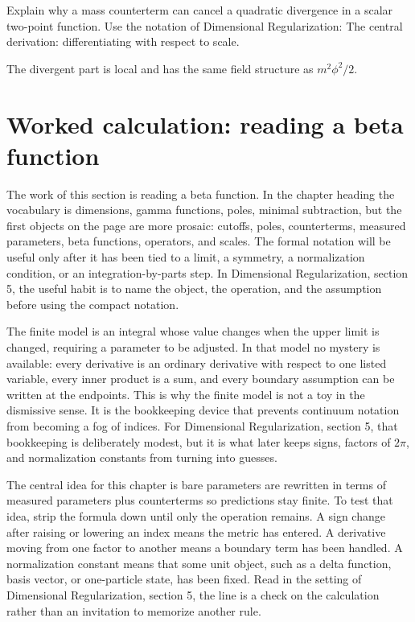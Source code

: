 \begin{exercise}
Explain why a mass counterterm can cancel a quadratic divergence in a scalar two-point function.  Use the notation of Dimensional Regularization: The central derivation: differentiating with respect to scale.
\begin{answer}
The divergent part is local and has the same field structure as \(m^2\phi^2/2\).
\end{answer}
\end{exercise}



\section{Worked calculation: reading a beta function}

The work of this section is reading a beta function.  In the chapter heading the vocabulary is dimensions, gamma functions, poles, minimal subtraction, but the first objects on the page are more prosaic: cutoffs, poles, counterterms, measured parameters, beta functions, operators, and scales.  The formal notation will be useful only after it has been tied to a limit, a symmetry, a normalization condition, or an integration-by-parts step.  In Dimensional Regularization, section 5, the useful habit is to name the object, the operation, and the assumption before using the compact notation.

The finite model is an integral whose value changes when the upper limit is changed, requiring a parameter to be adjusted.  In that model no mystery is available: every derivative is an ordinary derivative with respect to one listed variable, every inner product is a sum, and every boundary assumption can be written at the endpoints.  This is why the finite model is not a toy in the dismissive sense.  It is the bookkeeping device that prevents continuum notation from becoming a fog of indices.  For Dimensional Regularization, section 5, that bookkeeping is deliberately modest, but it is what later keeps signs, factors of \(2\pi\), and normalization constants from turning into guesses.

The central idea for this chapter is bare parameters are rewritten in terms of measured parameters plus counterterms so predictions stay finite.  To test that idea, strip the formula down until only the operation remains.  A sign change after raising or lowering an index means the metric has entered.  A derivative moving from one factor to another means a boundary term has been handled.  A normalization constant means that some unit object, such as a delta function, basis vector, or one-particle state, has been fixed.  Read in the setting of Dimensional Regularization, section 5, the line is a check on the calculation rather than an invitation to memorize another rule.

